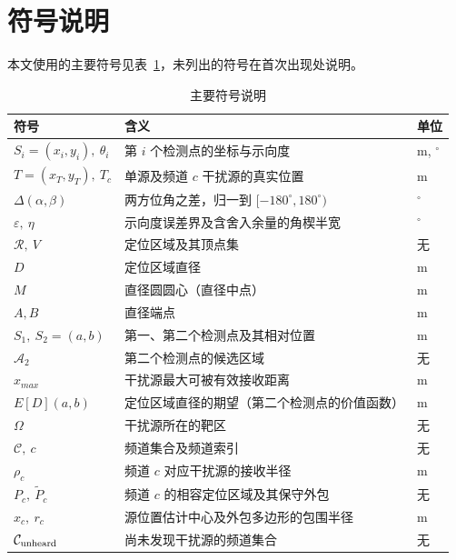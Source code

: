 \section{符号说明}
本文使用的主要符号见表~\ref{tab:symbol}，未列出的符号在首次出现处说明。

\begin{table}[!htbp]
    \caption{主要符号说明}\label{tab:symbol}
    \centering
    \begin{tabular}{lll}
        \toprule
        符号 & 含义 & 单位 \\
        \midrule
        $S_i=(x_i,y_i),\ \theta_i$ & 第 $i$ 个检测点的坐标与示向度 & m, $^\circ$ \\
        $T=(x_T,y_T),\ T_c$ & 单源及频道 $c$ 干扰源的真实位置 & m \\
        $\Delta(\alpha,\beta)$ & 两方位角之差，归一到 $[-180^\circ,180^\circ)$ & $^\circ$ \\
        $\varepsilon,\ \eta$ & 示向度误差界及含舍入余量的角楔半宽 & $^\circ$ \\
        $\mathcal{R},\ V$   & 定位区域及其顶点集 & 无 \\
        $D$                 & 定位区域直径 & m \\
        $M$                 & 直径圆圆心（直径中点） & m \\
        $A,B$               & 直径端点 & m \\
        $S_1,\ S_2=(a,b)$   & 第一、第二个检测点及其相对位置 & m \\
        $\mathcal A_2$      & 第二个检测点的候选区域 & 无 \\
        $x_{max}$           & 干扰源最大可被有效接收距离 & m \\
        $E[D](a,b)$       & 定位区域直径的期望（第二个检测点的价值函数） & m \\
        $\Omega$            & 干扰源所在的靶区 & 无 \\
        $\mathcal C,\ c$             & 频道集合及频道索引 & 无 \\
        $\rho_c$            & 频道 $c$ 对应干扰源的接收半径 & m \\
        $P_c,\ \widetilde P_c$ & 频道 $c$ 的相容定位区域及其保守外包 & 无 \\
        $\hat x_c,\ r_c$     & 源位置估计中心及外包多边形的包围半径 & m \\
        $\mathcal C_{\rm unheard}$ & 尚未发现干扰源的频道集合 & 无 \\

\end{tabular}
\end{table}
